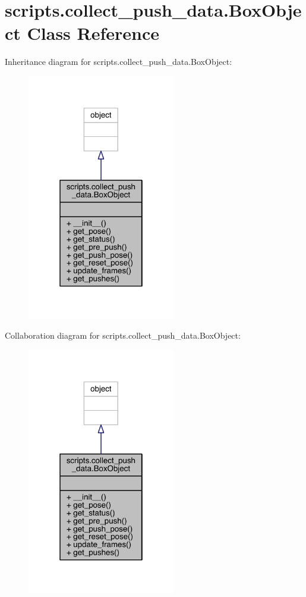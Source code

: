 \hypertarget{classscripts_1_1collect__push__data_1_1_box_object}{}\section{scripts.\+collect\+\_\+push\+\_\+data.\+Box\+Object Class Reference}
\label{classscripts_1_1collect__push__data_1_1_box_object}


Inheritance diagram for scripts.\+collect\+\_\+push\+\_\+data.\+Box\+Object\+:\nopagebreak
\begin{figure}[H]
\begin{center}
\leavevmode
\includegraphics[width=183pt]{classscripts_1_1collect__push__data_1_1_box_object__inherit__graph}
\end{center}
\end{figure}


Collaboration diagram for scripts.\+collect\+\_\+push\+\_\+data.\+Box\+Object\+:\nopagebreak
\begin{figure}[H]
\begin{center}
\leavevmode
\includegraphics[width=183pt]{classscripts_1_1collect__push__data_1_1_box_object__coll__graph}
\end{center}
\end{figure}
